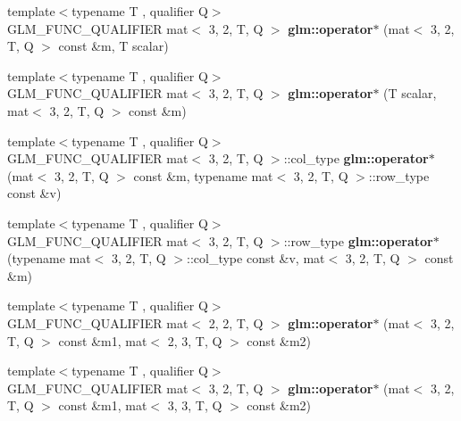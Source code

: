 \begin{DoxyCompactItemize}
\item 
\mbox{\label{type__mat3x2_8inl_a7cc820630c7977b58edacb1445979aaf}} 
{\footnotesize template$<$typename T , qualifier Q$>$ }\\G\+L\+M\+\_\+\+F\+U\+N\+C\+\_\+\+Q\+U\+A\+L\+I\+F\+I\+ER mat$<$ 3, 2, T, Q $>$ {\bfseries glm\+::operator$\ast$} (mat$<$ 3, 2, T, Q $>$ const \&m, T scalar)
\item 
\mbox{\label{type__mat3x2_8inl_af0e8aff249431ecfc857868c5a4d7035}} 
{\footnotesize template$<$typename T , qualifier Q$>$ }\\G\+L\+M\+\_\+\+F\+U\+N\+C\+\_\+\+Q\+U\+A\+L\+I\+F\+I\+ER mat$<$ 3, 2, T, Q $>$ {\bfseries glm\+::operator$\ast$} (T scalar, mat$<$ 3, 2, T, Q $>$ const \&m)
\item 
\mbox{\label{type__mat3x2_8inl_a2c7e7d65d33a6767060defe03c59c606}} 
{\footnotesize template$<$typename T , qualifier Q$>$ }\\G\+L\+M\+\_\+\+F\+U\+N\+C\+\_\+\+Q\+U\+A\+L\+I\+F\+I\+ER mat$<$ 3, 2, T, Q $>$\+::col\+\_\+type {\bfseries glm\+::operator$\ast$} (mat$<$ 3, 2, T, Q $>$ const \&m, typename mat$<$ 3, 2, T, Q $>$\+::row\+\_\+type const \&v)
\item 
\mbox{\label{type__mat3x2_8inl_a5ed2536927f15d0188a061a89a2aafb3}} 
{\footnotesize template$<$typename T , qualifier Q$>$ }\\G\+L\+M\+\_\+\+F\+U\+N\+C\+\_\+\+Q\+U\+A\+L\+I\+F\+I\+ER mat$<$ 3, 2, T, Q $>$\+::row\+\_\+type {\bfseries glm\+::operator$\ast$} (typename mat$<$ 3, 2, T, Q $>$\+::col\+\_\+type const \&v, mat$<$ 3, 2, T, Q $>$ const \&m)
\item 
\mbox{\label{type__mat3x2_8inl_a027c17cbc40f738d26c9c9897a537344}} 
{\footnotesize template$<$typename T , qualifier Q$>$ }\\G\+L\+M\+\_\+\+F\+U\+N\+C\+\_\+\+Q\+U\+A\+L\+I\+F\+I\+ER mat$<$ 2, 2, T, Q $>$ {\bfseries glm\+::operator$\ast$} (mat$<$ 3, 2, T, Q $>$ const \&m1, mat$<$ 2, 3, T, Q $>$ const \&m2)
\item 
\mbox{\label{type__mat3x2_8inl_abe65c51280e69b884cb8b7dbc4886cea}} 
{\footnotesize template$<$typename T , qualifier Q$>$ }\\G\+L\+M\+\_\+\+F\+U\+N\+C\+\_\+\+Q\+U\+A\+L\+I\+F\+I\+ER mat$<$ 3, 2, T, Q $>$ {\bfseries glm\+::operator$\ast$} (mat$<$ 3, 2, T, Q $>$ const \&m1, mat$<$ 3, 3, T, Q $>$ const \&m2)

\end{DoxyCompactItemize}

